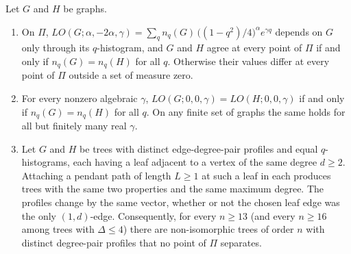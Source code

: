   \begin{theorem}\label{thm:ratioplane}
  Let $G$ and $H$ be graphs.
  \begin{enumerate}
  \item[(i)] On $\Pi$,
  $LO(G;\alpha,-2\alpha,\gamma) = \sum_q n_q(G)\,\bigl((1-q^2)/4\bigr)^{\alpha}
  e^{\gamma q}$ depends on $G$ only through its $q$-histogram, and $G$ and
  $H$ agree at every point of $\Pi$ if and only if $n_q(G) = n_q(H)$
  for all $q$. Otherwise their values differ at every point of $\Pi$
  outside a set of measure zero.
  \item[(ii)] For every nonzero algebraic $\gamma$,
  $LO(G;0,0,\gamma) = LO(H;0,0,\gamma)$ if and only if
  $n_q(G) = n_q(H)$ for all $q$. On any finite set of graphs the same
  holds for all but finitely many real $\gamma$.
  \item[(iii)] Let $G$ and $H$ be trees with distinct
  edge-degree-pair profiles and equal $q$-histograms, each having a
  leaf adjacent to a vertex of the same degree $d \ge 2$. Attaching a pendant path of length $L \ge 1$ at such a leaf in each
  produces trees with the same two properties and the same maximum
  degree. The profiles change by the same vector, whether or not the
  chosen leaf edge was the only $(1,d)$-edge.
  Consequently, for every $n \ge 13$ (and every $n \ge 16$ among trees
  with $\Delta \le 4$) there are non-isomorphic trees of order $n$
  with distinct degree-pair profiles that no point of $\Pi$ separates.
  \end{enumerate}
  \end{theorem}

